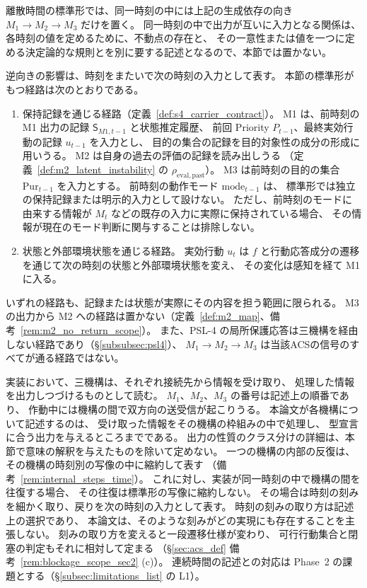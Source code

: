 \begin{remark}[機構間の送受信と同一時刻の記述]
\label{rem:tipa_bidirectional}
離散時間の標準形では、同一時刻の中には上記の生成依存の向き $M_1\to M_2\to M_3$ だけを置く。
同一時刻の中で出力が互いに入力となる関係は、
各時刻の値を定めるために、不動点の存在と、
その一意性または値を一つに定める決定論的な規則とを別に要する記述となるので、本節では置かない。

逆向きの影響は、時刻をまたいで次の時刻の入力として表す。
本節の標準形がもつ経路は次のとおりである。
\begin{enumerate}[label=(\roman*)]
  \item 保持記録を通じる経路（定義~\ref{def:s4_carrier_contract}）。
  M1 は、前時刻の M1 出力の記録 $\mathsf S_{M1,t-1}$ と状態推定履歴、
  前回 Priority $P_{t-1}$、最終実効行動の記録 $u_{t-1}$ を入力とし、
  目的の集合の記録を目的対象性の成分の形成に用いうる。
  M2 は自身の過去の評価の記録を読み出しうる
  （定義~\ref{def:m2_latent_instability} の $\rho_{\mathrm{eval,past}}$）。
  M3 は前時刻の目的の集合 $\mathrm{Pur}_{t-1}$ を入力とする。
  前時刻の動作モード $\mathrm{mode}_{t-1}$ は、
  標準形では独立の保持記録または明示的入力として設けない。
  ただし、前時刻のモードに由来する情報が
  $M_t$ などの既存の入力に実際に保持されている場合、
  その情報が現在のモード判断に関与することは排除しない。
  \item 状態と外部環境状態を通じる経路。
  実効行動 $u_t$ は $f$ と行動応答成分の遷移を通じて次の時刻の状態と外部環境状態を変え、
  その変化は感知を経て M1 に入る。
\end{enumerate}
いずれの経路も、記録または状態が実際にその内容を担う範囲に限られる。
M3 の出力から M2 への経路は置かない（定義~\ref{def:m2_map}、備考~\ref{rem:m2_no_return_scope}）。
また、PSL-4 の局所保護応答は三機構を経由しない経路であり（\S\ref{subsubsec:psl4}）、
$M_1\to M_2\to M_3$ は当該ACSの信号のすべてが通る経路ではない。

実装において、三機構は、それぞれ接続先から情報を受け取り、
処理した情報を出力しつづけるものとして読む。
$M_1$、$M_2$、$M_3$ の番号は記述上の順番であり、
作動中には機構の間で双方向の送受信が起こりうる。
本論文が各機構について記述するのは、
受け取った情報をその機構の枠組みの中で処理し、
型宣言に合う出力を与えるところまでである。
出力の性質のクラス分けの詳細は、本節で意味の解釈を与えたものを除いて定めない。
一つの機構の内部の反復は、その機構の時刻別の写像の中に縮約して表す
（備考~\ref{rem:internal_steps_time}）。
これに対し、実装が同一時刻の中で機構の間を往復する場合、
その往復は標準形の写像に縮約しない。
その場合は時刻の刻みを細かく取り、戻りを次の時刻の入力として表す。
時刻の刻みの取り方は記述上の選択であり、
本論文は、そのような刻みがどの実現にも存在することを主張しない。
刻みの取り方を変えると一段遷移仕様が変わり、
可行行動集合と閉塞の判定もそれに相対して定まる
（\S\ref{sec:acs_def} 備考~\ref{rem:blockage_scope_sec2} (c)）。
連続時間の記述との対応は Phase~2 の課題とする（\S\ref{subsec:limitations_list} の L1）。
\end{remark}

